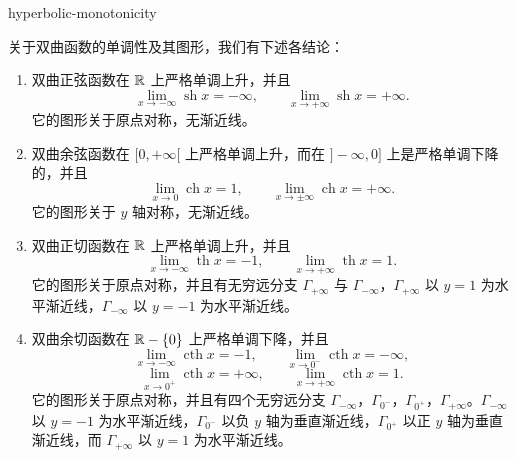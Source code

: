 \begin{mythm}{}{hyperbolic-monotonicity}

	关于双曲函数的单调性及其图形，我们有下述各结论：

	\begin{enumerate}[label=\arabic*)]
		\item 双曲正弦函数在 \(\mathbb{R}\) 上严格单调上升，并且
		\[
		\lim_{x\to-\infty}\operatorname{sh}x=-\infty,\qquad\lim_{x\to+\infty}\operatorname{sh}x=+\infty.
		\]
		它的图形关于原点对称，无渐近线。

		\item 双曲余弦函数在 \([0,+\infty[\) 上严格单调上升，而在 \(]-\infty,0]\) 上是严格单调下降的，并且
		\[
		\lim_{x\to0}\operatorname{ch}x=1,\qquad\lim_{x\to\pm\infty}\operatorname{ch}x=+\infty.
		\]
		它的图形关于 \(y\) 轴对称，无渐近线。

		\item 双曲正切函数在 \(\mathbb{R}\) 上严格单调上升，并且
		\[
		\lim_{x\to-\infty}\operatorname{th}x=-1,\qquad\lim_{x\to+\infty}\operatorname{th}x=1.
		\]
		它的图形关于原点对称，并且有无穷远分支 \(\Gamma_{+\infty}\) 与 \(\Gamma_{-\infty}\)，\(\Gamma_{+\infty}\) 以 \(y=1\) 为水平渐近线，\(\Gamma_{-\infty}\) 以 \(y=-1\) 为水平渐近线。

		\item 双曲余切函数在 \(\mathbb{R}-\{0\}\) 上严格单调下降，并且
		\[
		\lim_{x\to-\infty}\operatorname{cth}x=-1,\qquad\lim_{x\to0^-}\operatorname{cth}x=-\infty,
		\]
		\[
		\lim_{x\to0^+}\operatorname{cth}x=+\infty,\qquad\lim_{x\to+\infty}\operatorname{cth}x=1.
		\]
		它的图形关于原点对称，并且有四个无穷远分支 \(\Gamma_{-\infty}\)，\(\Gamma_{0^-}\)，\(\Gamma_{0^+}\)，\(\Gamma_{+\infty}\)。\(\Gamma_{-\infty}\) 以 \(y=-1\) 为水平渐近线，\(\Gamma_{0^-}\) 以负 \(y\) 轴为垂直渐近线，\(\Gamma_{0^+}\) 以正 \(y\) 轴为垂直渐近线，而 \(\Gamma_{+\infty}\) 以 \(y=1\) 为水平渐近线。
	\end{enumerate}

\end{mythm}

